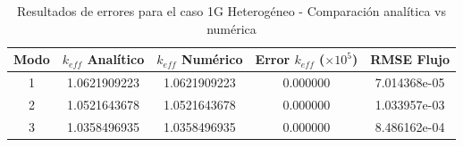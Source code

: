 \begin{table}[h]
\centering
\caption{Resultados de errores para el caso 1G Heterogéneo - Comparación analítica vs numérica}
\label{tab:errores_1g_heterogeneo}
\begin{tabular}{c|cc|cc}
\toprule
\textbf{Modo} & \textbf{$k_{eff}$ Analítico} & \textbf{$k_{eff}$ Numérico} & \textbf{Error $k_{eff}$ ($\times 10^5$)} & \textbf{RMSE Flujo} \\
\midrule
1 & 1.0621909223 & 1.0621909223 & 0.000000 & 7.014368e-05 \\
2 & 1.0521643678 & 1.0521643678 & 0.000000 & 1.033957e-03 \\
3 & 1.0358496935 & 1.0358496935 & 0.000000 & 8.486162e-04 \\
\bottomrule
\end{tabular}
\end{table}
